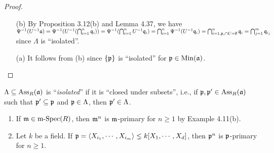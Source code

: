 \begin{proof}
    \begin{enumerate}
        \item [(b)] By Proposition 3.12(b) and Lemma 4.37, we have $\Psi^{-1}(U^{-1}\mathfrak{a}) = \Psi^{-1}(U^{-1}(\bigcap_{i=1}^{n}\mathfrak{q}_i)) = \Psi^{-1}(\bigcap_{i=1}^{n}U^{-1}\mathfrak{q}_i) = \bigcap_{i=1}^{n} \Psi^{-1}(U^{-1}\mathfrak{q}_i) = \bigcap_{i=1,\mathfrak{p}_i \cap U = \emptyset}^{n} \mathfrak{q}_i = \bigcap_{j=1}^{m} \mathfrak{q}_{i_j}$ since $\Lambda$ is ``isolated''.
        \item [(a)] It follows from (b) since $\{\mathfrak{p}\}$ is ``isolated'' for $\mathfrak{p} \in \operatorname{Min}(\mathfrak{a})$. \qedhere
    \end{enumerate}
\end{proof}

\begin{definition}
    $\Lambda \subseteq \operatorname{Ass}_R(\mathfrak{a})$ is ``\emph{isolated}'' if it is ``closed under subsets'', i.e., if $\mathfrak{p}, \mathfrak{p}' \in \operatorname{Ass}_R(\mathfrak{a})$ such that $\mathfrak{p}' \subseteq \mathfrak{p}$ and $\mathfrak{p} \in \Lambda$, then $\mathfrak{p}' \in \Lambda$.
\end{definition}

\begin{discussion}
    \begin{enumerate}
        \item
            If $\mathfrak{m} \in \operatorname{m-Spec}(R)$, then $\mathfrak{m}^{n}$ is $\mathfrak{m}$-primary for $n \geq 1$ by Example 4.11(b). \par 
        \item 
            Let $k$ be a field. If $\mathfrak{p} = \langle X_{i_1}, \cdots, X_{i_m} \rangle \lneq k[X_1,\cdots,X_d]$, then $\mathfrak{p}^{n}$ is $\mathfrak{p}$-primary for $n \geq 1$.
    \end{enumerate}
\end{discussion}

